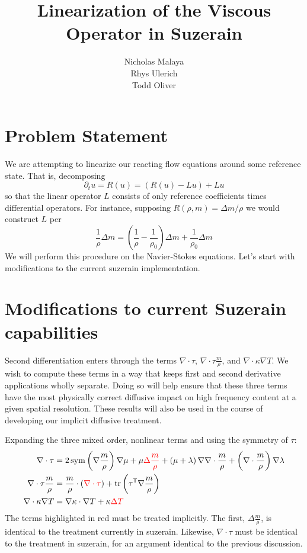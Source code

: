 \documentclass[10pt]{article}
\title{Linearization of the Viscous Operator in Suzerain}
\author{Nicholas Malaya \\
        Rhys Ulerich \\         
	Todd Oliver \\ }
\newcommand{\symmetricpart}[1]
  {\ensuremath{\operatorname{sym}\left(#1\right)}}
\DeclareMathOperator{\trace}{tr}
\newcommand{\trans}[1]{{#1}^{\ensuremath{\mathsf{T}}}}
\newcommand{\myred}[1]{{\color{red} #1}}
\begin{document}
\maketitle

\section{Problem Statement}

We are attempting to linearize our reacting flow equations around some
reference state.  That is, decomposing
\begin{equation}
\partial_t u = R(u) = \left(R(u) - Lu\right) + Lu
\end{equation}
so that the linear operator $L$ consists of only reference coefficients times
differential operators.  For instance, supposing $R(\rho, m) = \Delta m / \rho$
we would construct $L$ per
\begin{equation}
 \frac{1}{\rho}\Delta m = (\frac{1}{\rho}-\frac{1}{\rho_0})\Delta m +
  \frac{1}{\rho_0}\Delta m
\end{equation}
We will perform this procedure on the Navier-Stokes equations. Let's
start with modifications to the current suzerain implementation. 

\section{Modifications to current Suzerain capabilities}

Second differentiation enters through the terms
$\nabla\cdot\tau$, $\nabla\cdot\tau\frac{m}{\rho}$, and
$\nabla\cdot\kappa\nabla{}T$.  We wish to compute these terms in a way that keeps
first and second derivative applications wholly separate.  Doing so will help
ensure that these three terms have the most physically correct diffusive impact
on high frequency content at a given spatial resolution.  These results will
also be used in the course of developing our implicit diffusive treatment.


Expanding the three mixed order, nonlinear terms and using the symmetry of
$\tau$:
\begin{align}
\label{eq:nabla_cdot_tau_expansion}
  \nabla\cdot\tau
  &=
    2 \symmetricpart{\nabla\frac{m}{\rho}}\nabla\mu
  + \mu \myred{\Delta\frac{m}{\rho}}
  + \left(\mu+\lambda\right)\nabla\nabla\cdot\frac{m}{\rho}
  + \left(\nabla\cdot\frac{m}{\rho}\right)\nabla\lambda
\\
\label{eq:nabla_cdot_tau_u_expansion}
  \nabla\cdot\tau{}\frac{m}{\rho}
  &=
    \frac{m}{\rho}\cdot\left(\myred{\nabla\cdot\tau}\right)
  + \trace\left( \trans{\tau}\nabla\frac{m}{\rho} \right)
\\
  \nabla\cdot\kappa\nabla{}T \label{eq:mu_delta_T}
  &=
    \nabla\kappa\cdot\nabla{}T
  + \kappa \myred{\Delta{}T}
\end{align}
The terms highlighted in red must be treated implicitly. The first,
$\Delta\frac{m}{\rho}$, is identical to the treatment currently in
suzerain. Likewise, $\nabla\cdot\tau$ must be identical to the treatment
in suzerain, for an argument identical to the previous discussion.
\end{document}
